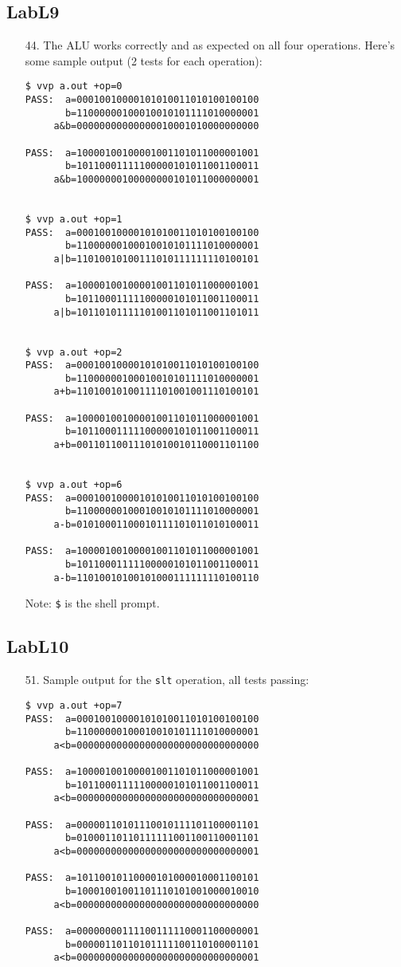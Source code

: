 \documentclass{article}
\begin{document}
\subsection{LabL9}
\begin{enumerate}
\item[44. ] The ALU works correctly and as expected on all four operations.
Here's some sample output (2 tests for each operation):
\begin{verbatim}
$ vvp a.out +op=0
PASS:  a=00010010000101010011010100100100
       b=11000000100010010101111010000001
     a&b=00000000000000010001010000000000

PASS:  a=10000100100001001101011000001001
       b=10110001111100000101011001100011
     a&b=10000000100000000101011000000001


$ vvp a.out +op=1
PASS:  a=00010010000101010011010100100100
       b=11000000100010010101111010000001
     a|b=11010010100111010111111110100101

PASS:  a=10000100100001001101011000001001
       b=10110001111100000101011001100011
     a|b=10110101111101001101011001101011


$ vvp a.out +op=2
PASS:  a=00010010000101010011010100100100
       b=11000000100010010101111010000001
     a+b=11010010100111101001001110100101

PASS:  a=10000100100001001101011000001001
       b=10110001111100000101011001100011
     a+b=00110110011101010010110001101100


$ vvp a.out +op=6
PASS:  a=00010010000101010011010100100100
       b=11000000100010010101111010000001
     a-b=01010001100010111101011010100011

PASS:  a=10000100100001001101011000001001
       b=10110001111100000101011001100011
     a-b=11010010100101000111111110100110
\end{verbatim}
  Note: \verb#$# is the shell prompt.
\end{enumerate}

\subsection{LabL10}
\begin{enumerate}
\item[51. ] Sample output for the \verb$slt$ operation, all tests passing:
\begin{verbatim}
$ vvp a.out +op=7
PASS:  a=00010010000101010011010100100100
       b=11000000100010010101111010000001
     a<b=00000000000000000000000000000000

PASS:  a=10000100100001001101011000001001
       b=10110001111100000101011001100011
     a<b=00000000000000000000000000000001

PASS:  a=00000110101110010111101100001101
       b=01000110110111111001100110001101
     a<b=00000000000000000000000000000001

PASS:  a=10110010110000101000010001100101
       b=10001001001101110101001000010010
     a<b=00000000000000000000000000000000

PASS:  a=00000000111100111110001100000001
       b=00000110110101111100110100001101
     a<b=00000000000000000000000000000001
\end{verbatim}
\end{enumerate}
\end{document}
